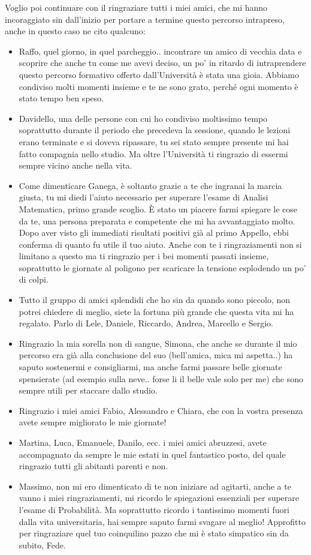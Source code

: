 Voglio poi continuare con il ringraziare tutti i miei amici, che mi hanno incoraggiato sin dall'inizio per portare a termine questo percorso intrapreso, anche in questo caso ne cito qualcuno:

\begin{itemize}
    \item Raffo, quel giorno, in quel parcheggio.. incontrare un amico di vecchia data e scoprire che anche tu come me avevi deciso, un po' in ritardo di intraprendere questo percorso formativo offerto dall'Universit\`a \`e stata una gioia. Abbiamo condiviso molti momenti insieme e te ne sono grato, perch\'e ogni momento \`e stato tempo ben speso.
    \item Davidello, una delle persone con cui ho condiviso moltissimo tempo soprattutto durante il periodo che precedeva la sessione, quando le lezioni erano terminate e si doveva ripassare, tu sei stato sempre presente mi hai fatto compagnia nello studio. Ma oltre l'Universit\`a ti ringrazio di essermi sempre vicino anche nella vita.
    \item Come dimenticare Ganega, \`e soltanto grazie a te che ingranai la marcia giusta, tu mi diedi l'aiuto necessario per superare l'esame di Analisi Matematica, primo grande scoglio. \`E stato un piacere farmi spiegare le cose da te, una persona preparata e competente che mi ha avvantaggiato molto. Dopo aver visto gli immediati risultati positivi gi\`a al primo Appello, ebbi conferma di quanto fu utile il tuo aiuto. Anche con te i ringraziamenti non si limitano a questo ma ti ringrazio per i bei momenti passati insieme, soprattutto le giornate al poligono per scaricare la tensione esplodendo un po' di colpi.
    \item Tutto il gruppo di amici splendidi che ho sin da quando sono piccolo, non potrei chiedere di meglio, siete la fortuna pi\`u grande che questa vita mi ha regalato. Parlo di Lele, Daniele, Riccardo, Andrea, Marcello e Sergio.
    \item Ringrazio la mia sorella non di sangue, Simona, che anche se durante il mio percorso era gi\`a alla conclusione del suo (bell'amica, mica mi aspetta..) ha saputo sostenermi e consigliarmi, ma anche farmi passare belle giornate spensierate (ad esempio sulla neve.. forse li il belle vale solo per me) che sono sempre utili per staccare dallo studio.
    \item Ringrazio i miei amici Fabio, Alessandro e Chiara, che con la vostra presenza avete sempre migliorato le mie giornate!
    \item Martina, Luca, Emanuele, Danilo, ecc. i miei amici abruzzesi, avete accompagnato da sempre le mie estati in quel fantastico posto, del quale ringrazio tutti gli abitanti parenti e non.
    \item Massimo, non mi ero dimenticato di te non iniziare ad agitarti, anche a te vanno i miei ringraziamenti, mi ricordo le spiegazioni essenziali per superare l'esame di Probabilit\`a. Ma soprattutto ricordo i tantissimo momenti fuori dalla vita universitaria, hai sempre saputo farmi svagare al meglio! Approfitto per ringraziare quel tuo coinquilino pazzo che mi \`e stato simpatico sin da subito, Fede.
\end{itemize}
